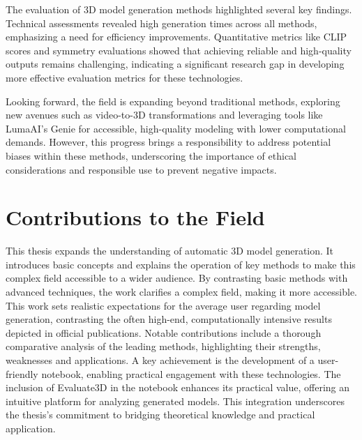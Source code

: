 The evaluation of 3D model generation methods highlighted several key findings. Technical assessments revealed high generation times across all methods, emphasizing a need for efficiency improvements. Quantitative metrics like CLIP scores and symmetry evaluations showed that achieving reliable and high-quality outputs remains challenging, indicating a significant research gap in developing more effective evaluation metrics for these technologies.

Looking forward, the field is expanding beyond traditional methods, exploring new avenues such as video-to-3D transformations and leveraging tools like LumaAI's Genie for accessible, high-quality modeling with lower computational demands. However, this progress brings a responsibility to address potential biases within these methods, underscoring the importance of ethical considerations and responsible use to prevent negative impacts.

\section{Contributions to the Field}

This thesis expands the understanding of automatic 3D model generation. It introduces basic concepts and explains the operation of key methods to make this complex field accessible to a wider audience. By contrasting basic methods with advanced techniques, the work clarifies a complex field, making it more accessible. This work sets realistic expectations for the average user regarding model generation, contrasting the often high-end, computationally intensive results depicted in official publications. Notable contributions include a thorough comparative analysis of the leading methods, highlighting their strengths, weaknesses and applications. A key achievement is the development of a user-friendly notebook, enabling practical engagement with these technologies. The inclusion of Evaluate3D in the notebook enhances its practical value, offering an intuitive platform for analyzing generated models. This integration underscores the thesis's commitment to bridging theoretical knowledge and practical application. 
